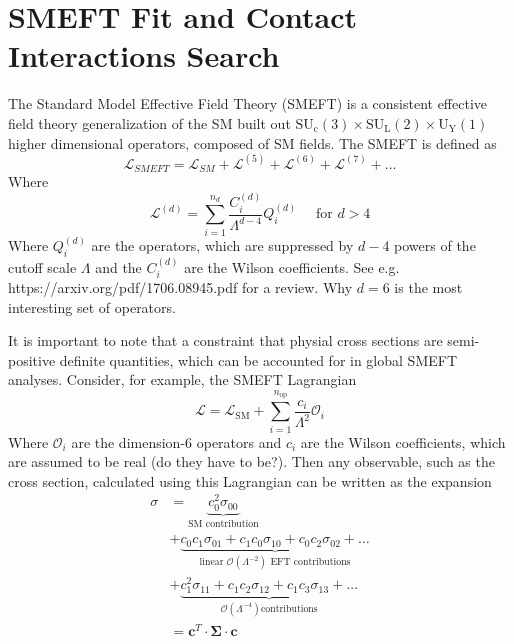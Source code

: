 \section{SMEFT Fit and Contact Interactions Search}
The Standard Model Effective Field Theory (SMEFT) is a consistent effective field theory generalization of the SM built out $\mathrm{SU}_{\mathrm{c}}(3) \times \mathrm{SU}_{\mathrm{L}}(2) \times \mathrm{U}_{\mathrm{Y}}(1)$ higher dimensional operators, composed of SM fields. The SMEFT is defined as 
\begin{equation}
    \mathcal{L}_{S M E F T}=\mathcal{L}_{S M}+\mathcal{L}^{(5)}+\mathcal{L}^{(6)}+\mathcal{L}^{(7)}+\ldots
\end{equation}
Where 
\begin{equation}
    \mathcal{L}^{(d)}=\sum_{i=1}^{n_{d}} \frac{C_{i}^{(d)}}{\Lambda^{d-4}} Q_{i}^{(d)} \quad \text { for } d>4
\end{equation}
Where $Q_{i}^{(d)}$ are the operators, which are suppressed by $d-4$ powers of the cutoff scale $\Lambda$ and the $C_{i}^{(d)}$ are the Wilson coefficients. See e.g. https://arxiv.org/pdf/1706.08945.pdf for a review.
Why $d=6$ is the most interesting set of operators.

It is important to note that a  constraint that physial cross sections are semi-positive definite quantities, which can be accounted for in global SMEFT analyses. Consider, for example, the SMEFT Lagrangian
\begin{equation}
    \mathcal{L}=\mathcal{L}_{\mathrm{SM}}+\sum_{i=1}^{n_{\mathrm{op}}} \frac{c_{i}}{\Lambda^{2}} \mathcal{O}_{i}
\end{equation}
Where $\mathcal{O}_{i}$ are the dimension-6 operators and $c_i$ are the Wilson coefficients, which are assumed to be real (do they have to be?). Then any observable, such as the cross section, calculated using this Lagrangian can be written as the expansion
\begin{equation}
    \begin{aligned}
\sigma &= \underbrace{c_{0}^{2} \sigma_{00}}_{\text{SM contribution}} \\
&+\underbrace{c_{0} c_{1} \sigma_{01}+c_{1} c_{0} \sigma_{10}+c_{0} c_{2} \sigma_{02}+\ldots}_{\text{linear $\mathcal{O}\left(\Lambda^{-2}\right)$ EFT contributions}} \\
&+\underbrace{c_{1}^{2} \sigma_{11}+c_{1} c_{2} \sigma_{12}+c_{1} c_{3} \sigma_{13}+\ldots}_{\mathcal{O} (\Lambda^{-4}) \text{contributions}} \\
&=\boldsymbol{c}^{T} \cdot \boldsymbol{\Sigma} \cdot \boldsymbol{c}
\end{aligned}
\end{equation}

